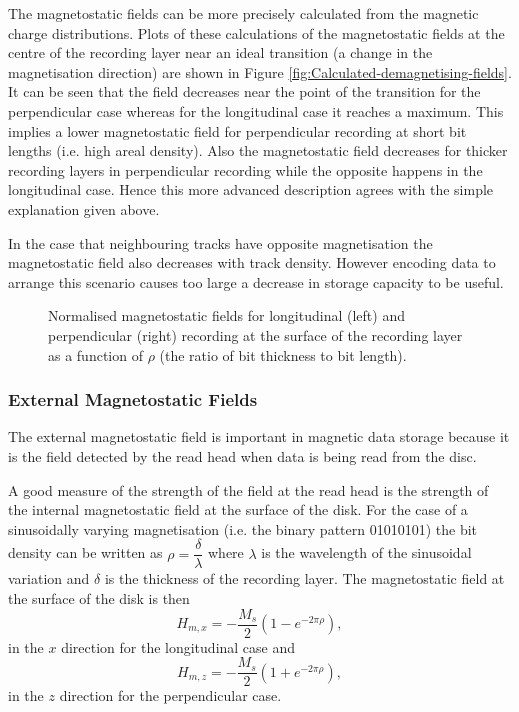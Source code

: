 The magnetostatic fields can be more precisely calculated from the magnetic
charge distributions. Plots of these calculations of the magnetostatic fields at
the centre of the recording layer near an ideal transition (a change in the
magnetisation direction) are shown in Figure
\ref{fig:Calculated-demagnetising-fields}. It can be seen that the field
decreases near the point of the transition for the perpendicular case whereas
for the longitudinal case it reaches a maximum. This implies a lower
magnetostatic field for perpendicular recording at short bit lengths (i.e. high
areal density). Also the magnetostatic field decreases for thicker recording
layers in perpendicular recording while the opposite happens in the longitudinal
case. Hence this more advanced description agrees with the simple explanation
given above.\cite{Litvinov2002}

In the case that neighbouring tracks have opposite magnetisation the
magnetostatic field also decreases with track density. However encoding data to
arrange this scenario causes too large a decrease in storage capacity to be
useful. \cite{Litvinov2002}

\begin{figure}
  \begin{center}
    \hspace{-5em} %
    
    \caption{Normalised magnetostatic fields for longitudinal (left) and perpendicular (right) recording at the surface of the recording layer as a function of $\rho$ (the ratio of bit thickness to bit length).}
    \label{fig:surface-demag}
  \end{center}
\end{figure}

\subsubsection{External Magnetostatic Fields}
\label{sec:Stray-fields}

The external magnetostatic field is important in magnetic data storage because
it is the field detected by the read head when data is being read from the
disc. \cite{Richter1999}

A good measure of the strength of the field at the read head is the strength of
the internal magnetostatic field at the surface of the disk. For the case of a
sinusoidally varying magnetisation (i.e. the binary pattern 01010101) the bit
density can be written as $\rho=\dfrac{\delta}{\lambda}$ where $\lambda$ is the
wavelength of the sinusoidal variation and $\delta$ is the thickness of the recording
layer. The magnetostatic field at the surface of the disk is then
\[ H_{m,x}=-\frac{M_s}{2}(1-e^{-2\pi\rho}),\]
in the $x$ direction for the longitudinal case and
\[ H_{m,z}=-\frac{M_s}{2}(1+e^{-2\pi\rho}),\]
in the $z$ direction for the perpendicular case. \cite{Richter1999}


